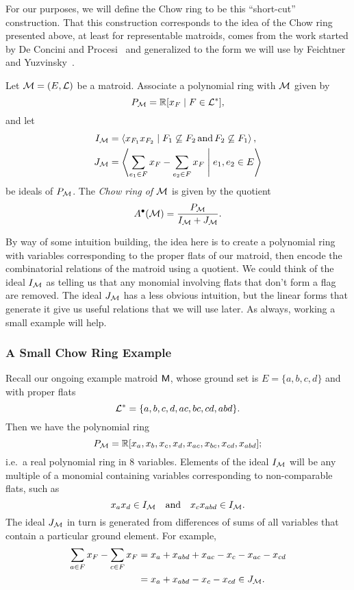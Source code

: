 \documentclass[12pt,oneside]{../../sfsuthesis}
\begin{document}
For our purposes, we will define the Chow ring to be this ``short-cut'' construction.
That this construction corresponds to the idea of the Chow ring presented above, at least for representable matroids, comes from the work started by De Concini and Procesi~\cite{deconciniWonderfulModelsSubspace1995} and generalized to the form we will use by Feichtner and Yuzvinsky~\cite{feichtnerChowRingsToric2004}.
\begin{definition}\label{def:chowRing}
    Let \( \mathcal{M} = (E, \mathcal{L})\) be a matroid.
    Associate a polynomial ring with \( \mathcal{M} \) given by
    \[
        P_{\mathcal{M}} = \mathbb{R}[x_F \; | \; F \in \mathcal{L}^\ast],
    \]
    and let
    \begin{align*}
        I_{\mathcal{M}} & = \left\langle x_{F_1}x_{F_2} \; \middle| \; F_1 \not\subseteq F_2\, \text{and}\, F_2 \not\subseteq F_1 \right\rangle, \\
        J_{\mathcal{M}} & = \left\langle \sum_{e_1 \in F} x_{F} - \sum_{e_2 \in F} x_{F} \; \middle| \; e_1, e_2 \in E \right\rangle
    \end{align*}
    be ideals of \(P_{\mathcal{M}}\).
    The \emph{Chow ring of \( \mathcal{M} \)} is given by the quotient
    \[
        A^{\bullet}(\mathcal{M}) = \frac{P_{\mathcal{M}}}{I_{\mathcal{M}} + J_{\mathcal{M}}}.
    \]
\end{definition}

By way of some intuition building, the idea here is to create a polynomial ring with variables corresponding to the proper flats of our matroid, then encode the combinatorial relations of the matroid using a quotient.
We could think of the ideal \( I_{\mathcal{M}} \) as telling us that any monomial involving flats that don't form a flag are removed.
The ideal \( J_{\mathcal{M}} \) has a less obvious intuition, but the linear forms that generate it give us useful relations that we will use later.
As always, working a small example will help.

\subsubsection{A Small Chow Ring Example}
Recall our ongoing example matroid \( \mathsf{M} \), whose ground set is \( E = \{ a,b,c,d \} \) and with proper flats
\[
    \mathcal{L}^\ast = \{ a, b, c, d, ac, bc, cd, abd \}.
\]
Then we have the polynomial ring
\[
    P_{\mathcal{M}} = \mathbb{R}[x_{a}, x_{b}, x_{c}, x_{d}, x_{ac}, x_{bc}, x_{cd}, x_{abd}];
\]
i.e.\ a real polynomial ring in 8 variables.
Elements of the ideal \( I_{\mathcal{M}} \) will be any multiple of a monomial containing variables corresponding to non-comparable flats, such as
\[
    x_a x_d \in I_{\mathcal{M}} \quad \text{and} \quad x_c x_{abd} \in I_{\mathcal{M}}.
\]
The ideal \( J_{\mathcal{M}} \) in turn is generated from differences of sums of all variables that contain a particular ground element. For example,
\begin{align*}
    \sum_{a \in F}x_F - \sum_{c \in F}x_F & = x_a + x_{abd} + x_{ac} - x_c - x_{ac} - x_{cd} \\
                                          & = x_a + x_{abd} - x_c - x_{cd} \in J_{\mathcal{M}}.
\end{align*}
\end{document}
